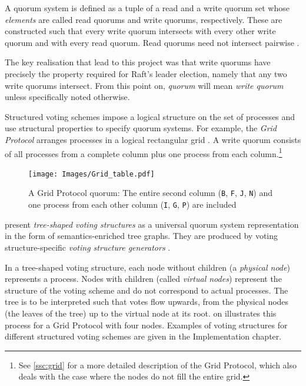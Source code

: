 \documentclass[12pt,chapterprefix=true,toc=bibliography,numbers=noendperiod,
               footnotes=multiple,twoside]{scrreprt}
\begin{document}

A quorum system is defined as a tuple of a read and a write quorum set whose \emph{elements} are called read quorums and write quorums, respectively. These are constructed such that every write quorum intersects with every other write quorum and with every read quorum. Read quorums need not intersect pairwise \autocite[For a formal definition of \emph{quorum}, \emph{quorum set} and \emph{quorum system}, see][section 2.3]{voting}.

The key realisation that lead to this project was that write quorums have precisely the property required for Raft's leader election, namely that any two write quorums intersect. From this point on, \emph{quorum} will mean \emph{write quorum} unless specifically noted otherwise.

\label{voting-example}

Structured voting schemes impose a logical structure on the set of processes and use structural properties to specify quorum systems. For example, the \emph{Grid Protocol} arranges processes in a logical rectangular grid \autocite{grid}. A write quorum consists of all processes from a complete column plus one process from each column.\footnote{See \cref{ssc:grid} for a more detailed description of the Grid Protocol, which also deals with the case where the nodes do not fill the entire grid.}

\begin{figure}[h]
    \centering
    \texttt{[image: Images/Grid\_table.pdf]}
    \caption[Grid Protocol quorum table]{A Grid Protocol quorum: The entire second column (\texttt{B}, \texttt{F}, \texttt{J}, \texttt{N}) and one process from each other column (\texttt{I}, \texttt{G}, \texttt{P}) are included}
    \label{fig:grid-quorum}
\end{figure}


\citeauthor{generators} present \emph{tree-shaped voting structures} as a universal quorum system representation in the form of semantics-enriched tree graphs. They are produced by voting structure-specific \emph{voting structure generators} \autocite{generators}.

In a tree-shaped voting structure, each node without children (a \emph{physical node}) represents a process. Nodes with children (called \emph{virtual nodes}) represent the structure of the voting scheme and do not correspond to actual processes. The tree is to be interpreted such that votes flow upwards, from the physical nodes (the leaves of the tree) up to the virtual node at its root.  on  illustrates this process for a Grid Protocol with four nodes. Examples of voting structures for different structured voting schemes are given in the Implementation chapter.
\end{document}
